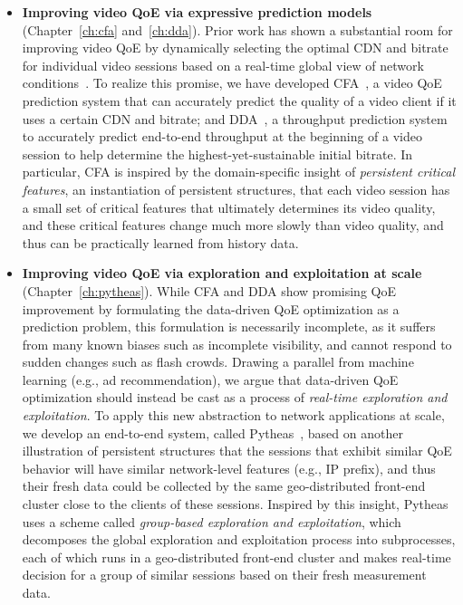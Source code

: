 \begin{itemize}

\item {\bf Improving video QoE via expressive prediction models} 
(Chapter~\ref{ch:cfa} and~\ref{ch:dda}). 
Prior work has shown a substantial room for improving video QoE by 
dynamically selecting the optimal CDN and bitrate for individual video 
sessions based on a real-time global view of network 
conditions~\cite{sigcomm12}.
To realize this promise, we have developed CFA~\cite{cfa}, a video QoE prediction 
system that can accurately predict the quality of a video client if it uses 
a certain CDN and bitrate; and DDA~\cite{dda}, a throughput prediction system
to accurately predict end-to-end throughput at the beginning of a 
 video session to help determine the highest-yet-sustainable initial bitrate.
In particular, CFA is inspired by the domain-specific insight of 
{\em persistent critical features}, an instantiation of persistent structures, that
each video session has a small set of critical features that ultimately 
determines its video quality, and these critical features change much 
more slowly than video quality, and thus can be practically 
learned from history data.

\item {\bf Improving video QoE via exploration and exploitation at scale} 
(Chapter~\ref{ch:pytheas}). 
While CFA and DDA show promising QoE improvement by formulating the 
data-driven QoE optimization as a prediction problem, this formulation is necessarily 
incomplete, as it suffers from many known biases such as incomplete visibility, 
and cannot respond to sudden changes such as flash crowds.
Drawing a parallel from machine learning (e.g., ad recommendation), 
we argue that data-driven QoE optimization should instead be 
cast as a process of {\em real-time exploration and exploitation}. 
To apply this new abstraction to network applications at scale, 
we develop an end-to-end system, called Pytheas~\cite{pytheas}, based on 
another illustration of persistent structures that 
the sessions that exhibit similar QoE behavior will have similar network-level 
features (e.g., IP prefix), and thus their fresh data could be collected 
by the same geo-distributed front-end cluster close to the clients of
these sessions. Inspired by this insight, Pytheas uses a scheme called 
{\em group-based exploration and exploitation},  which decomposes the 
global exploration and exploitation process into 
subprocesses, each of which runs in a geo-distributed front-end cluster 
 and makes real-time decision for a group of similar sessions
based on their fresh measurement data.


\end{itemize}
